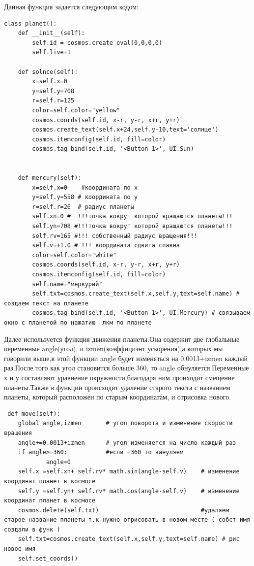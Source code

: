 \documentclass[11pt,a4paper]{report}
\begin{document}
Данная функция задается следующим кодом:
\begin{verbatim}
class planet():
    def __init__(self):
        self.id = cosmos.create_oval(0,0,0,0)
        self.live=1
        
    def solnce(self):
        x=self.x=0
        y=self.y=708
        r=self.r=125
        color=self.color="yellow"
        cosmos.coords(self.id, x-r, y-r, x+r, y+r)
        cosmos.create_text(self.x+24,self.y-10,text='солнце')
        cosmos.itemconfig(self.id, fill=color)
        cosmos.tag_bind(self.id, '<Button-1>', UI.Sun)
      
        
    def mercury(self):
        x=self.x=0    #координата по х
        y=self.y=558 # координата по у
        r=self.r=26  # радиус планеты
        self.xn=0 #  !!!точка вокруг которой вращаются планеты!!!
        self.yn=708 #!!!точка вокруг которой вращаются планеты!!!
        self.rv=165 #!!! собственный радиус вращения!!!
        self.v=+1.0 # !!! координата сдвига спавна 
        color=self.color="white"
        cosmos.coords(self.id, x-r, y-r, x+r, y+r)
        cosmos.itemconfig(self.id, fill=color) 
        self.name="меркурий"
        self.txt=cosmos.create_text(self.x,self.y,text=self.name) # создаем текст на планете
        cosmos.tag_bind(self.id, '<Button-1>', UI.Mercury) # связываем окно с планетой по нажатию  лкм по планете

\end{verbatim}
Далее используется функция движения планеты.Она содержит две глобальные переменные angle(угол), и izmen(коэффициэнт ускорения),а которых мы говорили выше,в этой функции angle будет изменяться на 0.0013+izmen каждый раз.После того как угол становится больше 360, то angle обнуляется.Переменные х и у составляют уравнение окружности,благодаря ним проиходит смещение планеты.Также в функции происходит удаление старого текста с названием планеты, который расположен по старым координатам, и отрисовка нового.

\begin{verbatim}
 def move(self):
    global angle,izmen       # угол поворота и изменение скорости вращения 
    angle+=0.0013+izmen      # угол изменяется на число каждый раз
    if angle>=360:           #если =360 то зануляем
            angle=0
    self.x =self.xn+ self.rv* math.sin(angle-self.v)    # изменение координат планет в космосе 
    self.y =self.yn+ self.rv* math.cos(angle-self.v)    # изменение координат планет в космосе
    cosmos.delete(self.txt)                             #удаляем старое название планеты т.к нужно отрисовать в новом месте ( собст имя создали в функ )
    self.txt=cosmos.create_text(self.x,self.y,text=self.name) # рис новое имя
    self.set_coords()   
\end{verbatim}
\end{document}
